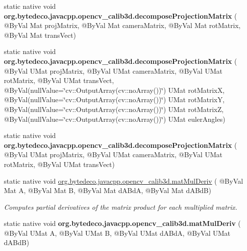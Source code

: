 \begin{DoxyCompactItemize}
static native void {\bfseries org.\+bytedeco.\+javacpp.\+opencv\+\_\+calib3d.\+decompose\+Projection\+Matrix} ( @By\+Val Mat proj\+Matrix, @By\+Val Mat camera\+Matrix, @By\+Val Mat rot\+Matrix, @By\+Val Mat trans\+Vect)
\item 
\mbox{\label{group__calib3d_ga0db69c11a83e0374c355113831f867d4}} 
static native void {\bfseries org.\+bytedeco.\+javacpp.\+opencv\+\_\+calib3d.\+decompose\+Projection\+Matrix} ( @By\+Val U\+Mat proj\+Matrix, @By\+Val U\+Mat camera\+Matrix, @By\+Val U\+Mat rot\+Matrix, @By\+Val U\+Mat trans\+Vect, @By\+Val(null\+Value=\char`\"{}cv\+::\+Output\+Array(cv\+::no\+Array())\char`\"{}) U\+Mat rot\+MatrixX, @By\+Val(null\+Value=\char`\"{}cv\+::\+Output\+Array(cv\+::no\+Array())\char`\"{}) U\+Mat rot\+MatrixY, @By\+Val(null\+Value=\char`\"{}cv\+::\+Output\+Array(cv\+::no\+Array())\char`\"{}) U\+Mat rot\+MatrixZ, @By\+Val(null\+Value=\char`\"{}cv\+::\+Output\+Array(cv\+::no\+Array())\char`\"{}) U\+Mat euler\+Angles)
\item 
\mbox{\label{group__calib3d_gace3c34696acb4363149fda2de71ffd3d}} 
static native void {\bfseries org.\+bytedeco.\+javacpp.\+opencv\+\_\+calib3d.\+decompose\+Projection\+Matrix} ( @By\+Val U\+Mat proj\+Matrix, @By\+Val U\+Mat camera\+Matrix, @By\+Val U\+Mat rot\+Matrix, @By\+Val U\+Mat trans\+Vect)
\item 
static native void \hyperlink{group__calib3d_ga54d99b18b60bd50e50e0de105d68003b}{org.\+bytedeco.\+javacpp.\+opencv\+\_\+calib3d.\+mat\+Mul\+Deriv} ( @By\+Val Mat A, @By\+Val Mat B, @By\+Val Mat d\+A\+BdA, @By\+Val Mat d\+A\+BdB)
\begin{DoxyCompactList}\small\item\em Computes partial derivatives of the matrix product for each multiplied matrix. \end{DoxyCompactList}\item 
\mbox{\label{group__calib3d_ga4daa85c9ad0cc8ae8187b1425678400f}} 
static native void {\bfseries org.\+bytedeco.\+javacpp.\+opencv\+\_\+calib3d.\+mat\+Mul\+Deriv} ( @By\+Val U\+Mat A, @By\+Val U\+Mat B, @By\+Val U\+Mat d\+A\+BdA, @By\+Val U\+Mat d\+A\+BdB)
\item 

\end{DoxyCompactItemize}
